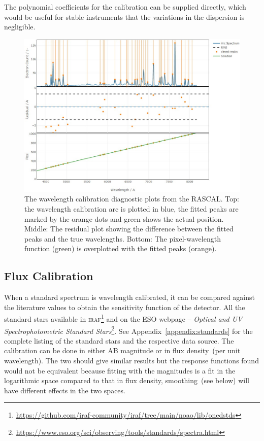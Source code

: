 \documentclass[fleqn,usenatbib]{mnras}
\begin{document}
The polynomial coefficients for the calibration can be supplied
directly, which would be useful for stable instruments that
the variations in the dispersion is negligible.

\begin{figure}
    \centering
    \includegraphics[width=\columnwidth]{fig_05_wavelength_calibration_diagnostics.jpg}
    \caption{The wavelength calibration diagnostic plots from the
    RASCAL. Top: the wavelength calibration arc is plotted in blue,
    the fitted peaks are marked by the orange dots and green shows
    the actual position. Middle: The residual plot showing the
    difference between the fitted peaks and the true wavelengths.
    Bottom: The pixel-wavelength function (green) is overplotted with
    the fitted peaks (orange).}
    \label{fig:wavecal}
\end{figure}

\subsection{Flux Calibration}
When a standard spectrum is wavelength calibrated, it can be
compared against the literature values to obtain the sensitivity
function of the detector. All the standard stars available in
\textsc{iraf}\footnote{\url{https://github.com/iraf-community/iraf/tree/main/noao/lib/onedstds}}
and on the ESO webpage -- \textit{Optical and UV Spectrophotometric
Standard Stars}\footnote{\url{https://www.eso.org/sci/observing/tools/standards/spectra.html}}.
See Appendix~\ref{appendix:standards} for the complete listing of the
standard stars and the respective data source. The calibration can be
done in either AB magnitude or in flux density~(per unit wavelength).
The two should give similar results but the response functions found
would not be equivalent because fitting with the magnitudes is a fit in
the logarithmic space compared to that in flux density, smoothing~(see
below) will have different effects in the two spaces.
\end{document}
